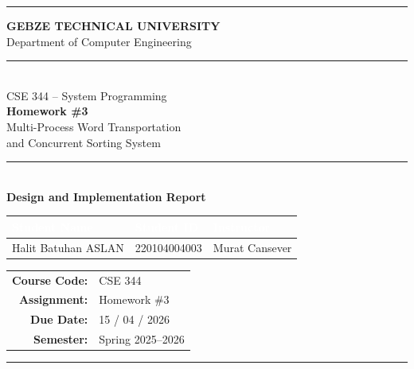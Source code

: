 \documentclass[12pt,a4paper]{article}
\begin{document}

\begin{titlepage}
  \thispagestyle{empty}

  \pagecolor{darkblue}
  \color{white}

  \vspace*{2.5cm}

  {\color{accent}\rule{\textwidth}{2pt}}
  \vspace{0.4cm}

  {\centering
    {\large\bfseries GEBZE TECHNICAL UNIVERSITY}\\[0.2cm]
    {\normalsize Department of Computer Engineering}\\[0.6cm]

    {\color{accent}\rule{0.6\textwidth}{0.5pt}}\\[0.8cm]

    {\Large CSE 344 -- System Programming}\\[0.5cm]
    {\fontsize{30}{36}\selectfont\bfseries Homework \#3}\\[0.5cm]
    {\large Multi-Process Word Transportation\\[0.2cm]
     and Concurrent Sorting System}\\[0.8cm]

    {\color{accent}\rule{0.6\textwidth}{0.5pt}}\\[0.5cm]

    {\large\bfseries\color{accent} Design and Implementation Report}\\[2.5cm]
  }

  \begin{center}
  \begin{tabular}{|p{4.5cm}|p{4.5cm}|p{4.5cm}|}
    \hline
    \rowcolor{midblue}
    \textcolor{white}{\textbf{Student Name}} &
    \textcolor{white}{\textbf{Student ID}} &
    \textcolor{white}{\textbf{Instructor}} \\
    \hline
    \rule{0pt}{14pt}Halit Batuhan ASLAN & 220104004003 & Murat Cansever \\[4pt]
    \hline
  \end{tabular}
  \end{center}

  \vfill

  \begin{center}
  \begin{tabular}{rl}
    \textbf{Course Code:} & CSE 344 \\
    \textbf{Assignment:}  & Homework \#3 \\
    \textbf{Due Date:}    & 15 / 04 / 2026 \\
    \textbf{Semester:}    & Spring 2025--2026 \\
  \end{tabular}
  \end{center}

  \vspace{0.3cm}
  {\color{accent}\rule{\textwidth}{2pt}}
\end{titlepage}
\end{document}
